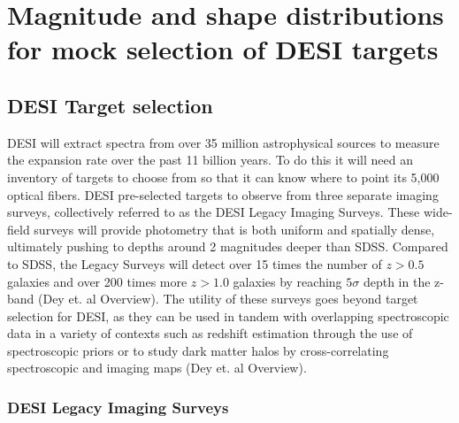 \chapter{Magnitude and shape distributions for mock selection of DESI targets}

\section{DESI Target selection}


DESI will extract spectra from over 35 million astrophysical sources to measure the expansion rate over the past 11 billion years. To do this it will need an inventory of targets to choose from so that it can know where to point its 5,000 optical fibers. DESI pre-selected targets to observe from three separate imaging surveys, collectively referred to as the DESI Legacy Imaging Surveys. These wide-field surveys will provide photometry that is both uniform and spatially dense, ultimately pushing to depths around 2 magnitudes deeper than SDSS.  Compared to SDSS, the Legacy Surveys will detect over 15 times the number of $z>0.5$ galaxies and over 200 times more $z>1.0$ galaxies by reaching $5\sigma$ depth in the z-band (Dey et. al Overview). The utility of these surveys goes beyond target selection for DESI, as they can be used in tandem with overlapping spectroscopic data in a variety of contexts such as redshift estimation through the use of spectroscopic priors or to study dark matter halos by cross-correlating spectroscopic and imaging maps (Dey et. al Overview).

\subsection{DESI Legacy Imaging Surveys}


